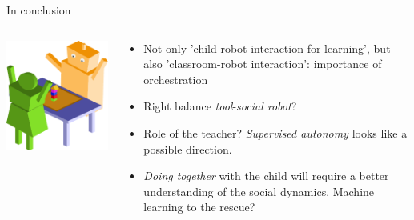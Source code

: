 \documentclass[compress]{beamer}
\begin{document}
\begin{frame}{In conclusion}

    \begin{columns}
        \begin{column}{0.4\linewidth}
            
            \begin{center}
                \includegraphics[width=0.9\linewidth]{joint-action-scenario-completed}
            \end{center}
        \end{column}
        \begin{column}{0.6\linewidth}
    \begin{itemize}
        \item<+-> Not only 'child-robot interaction for learning', but also
            'classroom-robot interaction': importance of orchestration
        \item<+-> Right balance \emph{tool}-\emph{social robot}?
        \item<+-> Role of the teacher? \emph{Supervised autonomy} looks like a
            possible direction.
        \item<+-> \emph{Doing together} with the child will require a better
            understanding of the social dynamics. Machine learning to the
            rescue?
    \end{itemize}
        \end{column}
    \end{columns}
\end{frame}
\end{document}
